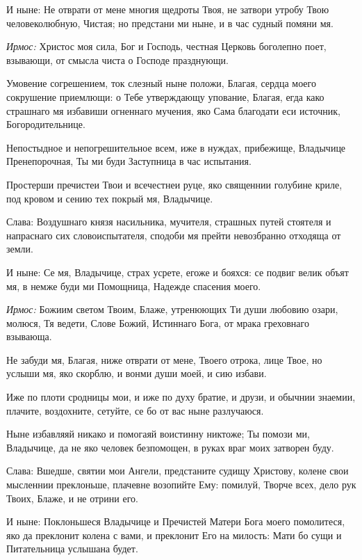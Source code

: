 \begin{mymulticols}
И ныне: Не отврати от мене многия щедроты Твоя, не затвори утробу Твою человеколюбную, Чистая; но предстани ми ныне, и в час судный помяни мя.




{\itshape Ирмос:} Христос моя сила, Бог и Господь, честная Церковь боголепно поет, взывающи, от смысла чиста о Господе празднующи. 

Умовение согрешением, ток слезный ныне положи, Благая, сердца моего сокрушение приемлющи: о Тебе утверждающу упование, Благая, егда како страшнаго мя избавиши огненнаго мучения, яко Сама благодати еси источник, Богородительнице. 

Непостыдное и непогрешительное всем, иже в нуждах, прибежище, Владычице Пренепорочная, Ты ми буди Заступница в час испытания. 

Простерши пречистеи Твои и всечестнеи руце, яко священнии голубине криле, под кровом и сению тех покрый мя, Владычице. 

Слава: Воздушнаго князя насильника, мучителя, страшных путей стоятеля и напраснаго сих словоиспытателя, сподоби мя прейти невозбранно отходяща от земли. 

И ныне: Се мя, Владычице, страх усрете, егоже и бояхся: се подвиг велик объят мя, в немже буди ми Помощница, Надежде спасения моего.




{\itshape Ирмос:} Божиим светом Твоим, Блаже, утренюющих Ти души любовию озари, молюся, Тя ведети, Слове Божий, Истиннаго Бога, от мрака греховнаго взывающа. 

Не забуди мя, Благая, ниже отврати от мене, Твоего отрока, лице Твое, но услыши мя, яко скорблю, и вонми души моей, и сию избави. 

Иже по плоти сродницы мои, и иже по духу братие, и друзи, и обычнии знаемии, плачите, воздохните, сетуйте, се бо от вас ныне разлучаюся. 

Ныне избавляяй никако и помогаяй воистинну никтоже; Ты помози ми, Владычице, да не яко человек безпомощен, в руках враг моих затворен буду. 

Слава: Вшедше, святии мои Ангели, предстаните судищу Христову, колене свои мысленнии преклоньше, плачевне возопийте Ему: помилуй, Творче всех, дело рук Твоих, Блаже, и не отрини его. 

И ныне: Поклоньшеся Владычице и Пречистей Матери Бога моего помолитеся, яко да преклонит колена с вами, и преклонит Его на милость: Мати бо сущи и Питательница услышана будет.



\end{mymulticols}
